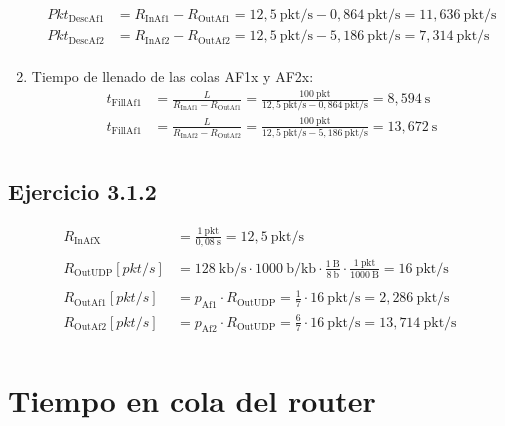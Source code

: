 \begin{enumerate}
\[\begin{aligned}
            Pkt_{\text{DescAf1}} &= R_{\text{InAf1}} - R_{\text{OutAf1}} = 12,5~\text{pkt/s} - 0,864~\text{pkt/s} = 11,636~\text{pkt/s} \\
            Pkt_{\text{DescAf2}} &= R_{\text{InAf2}} - R_{\text{OutAf2}} = 12,5~\text{pkt/s} - 5,186~\text{pkt/s} = 7,314~\text{pkt/s} \\
        \end{aligned}
    \]
    \item Tiempo de llenado de las colas AF1x y AF2x:
    \[
        \begin{aligned}
            t_{\text{FillAf1}} &= \frac{L}{R_{\text{InAf1}} - R_{\text{OutAf1}}} = \frac{100~\text{pkt}}{12,5~\text{pkt/s} - 0,864~\text{pkt/s}} = 8,594~\text{s} \\
            t_{\text{FillAf1}} &= \frac{L}{R_{\text{InAf2}} - R_{\text{OutAf2}}} = \frac{100~\text{pkt}}{12,5~\text{pkt/s} - 5,186~\text{pkt/s}} = 13,672~\text{s} \\
        \end{aligned}
    \]
\end{enumerate}

\vspace{0,3cm}

\subsection{Ejercicio 3.1.2}
\[
    \begin{aligned}
        R_{\text{InAfX}} &= \frac{1~\text{pkt}}{0,08~\text{s}} = 12,5~\text{pkt/s} \\ \\
        R_{\text{OutUDP}}[pkt/s] &= 128~\text{kb/s} \cdot 1000~\text{b/kb} \cdot \frac{1~\text{B}}{8~\text{b}} \cdot \frac{1~\text{pkt}}{1000~\text{B}} = 16~\text{pkt/s} \\ \\
        R_{\text{OutAf1}}[pkt/s] &= p_{\text{Af1}} \cdot R_{\text{OutUDP}} = \frac{1}{7} \cdot 16~\text{pkt/s} = 2,286~\text{pkt/s} \\
        R_{\text{OutAf2}}[pkt/s] &= p_{\text{Af2}} \cdot R_{\text{OutUDP}} = \frac{6}{7} \cdot 16~\text{pkt/s} = 13,714~\text{pkt/s} \\
    \end{aligned}
\]

\vspace{1cm}

\section{Tiempo en cola del router}
